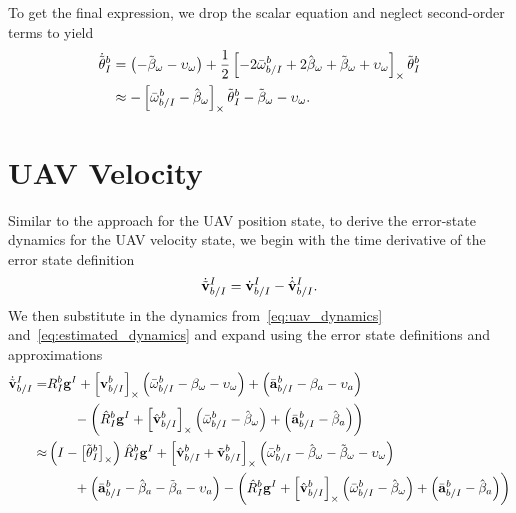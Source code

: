 To get the final expression, we drop the scalar equation and neglect
second-order terms to yield
\begin{align}
  \dot{\tilde{\mathrm{\mathbf{\theta}}}}_I^b
  &=
    \left( - \tilde{\mathrm{\mathbf{\beta}}}_\omega -
    \mathrm{\mathbf{\upsilon}}_\omega \right) 
    + \frac{1}{2}
    \left[  -2\bar{\mathrm{\mathbf{\omega}}}_{b/I}^b + 2\hat{\mathrm{\mathbf{\beta}}}_\omega
      + \tilde{\mathrm{\mathbf{\beta}}}_\omega + \mathrm{\mathbf{\upsilon}}_\omega  \right]_{\times}
    \tilde{\mathrm{\mathbf{\theta}}}_I^b \\
  &\approx
  -\left[  \bar{\mathrm{\mathbf{\omega}}}_{b/I}^b - \hat{\mathrm{\mathbf{\beta}}}_\omega \right]_{\times}
    \tilde{\mathrm{\mathbf{\theta}}}_I^b
    - \tilde{\mathrm{\mathbf{\beta}}}_\omega -
    \mathrm{\mathbf{\upsilon}}_\omega .
\end{align}

\section{UAV Velocity}
Similar to the approach for the UAV position state, to derive the error-state
dynamics for the UAV velocity state, we begin with the time derivative of the
error state definition
\begin{equation}
  \dot{\tilde{\mathrm{\mathbf{v}}}}_{b/I}^I = \dot{\mathrm{\mathbf{v}}}_{b/I}^I -
  \dot{\hat{\mathrm{\mathbf{v}}}}_{b/I}^I.
\end{equation}
We then substitute in the dynamics from~\eqref{eq:uav_dynamics}
and~\eqref{eq:estimated_dynamics} and expand using the error state definitions
and approximations
\begin{align}
  \dot{\tilde{\mathrm{\mathbf{v}}}}_{b/I}^I
  =&
  R_I^b \mathrm{\mathbf{g}}^I
  +
  \left[ \mathrm{\mathbf{v}}_{b/I}^b \right]_{\times}
  \left( \bar{\mathrm{\mathbf{\omega}}}_{b/I}^b - \mathrm{\mathbf{\beta}}_\omega -
  \mathrm{\mathbf{\upsilon}}_\omega \right)
  +
  \left( \bar{\mathrm{\mathbf{a}}}_{b/I}^b - \mathrm{\mathbf{\beta}}_a - \mathrm{\mathbf{\upsilon}}_a \right) \\
                                  & \qquad -
                                  \left( \hat{R}_I^b \mathrm{\mathbf{g}}^I
  +
  \left[ \hat{\mathrm{\mathbf{v}}}_{b/I}^b \right]_{\times}
  \left( \bar{\mathrm{\mathbf{\omega}}}_{b/I}^b - \hat{\mathrm{\mathbf{\beta}}}_\omega \right)
  +
\left( \bar{\mathrm{\mathbf{a}}}_{b/I}^b - \hat{\mathrm{\mathbf{\beta}}}_a \right) \right) \nonumber \\
  \approx&
  \left( I - \left[ \tilde{\mathrm{\mathbf{\theta}}}_I^b  \right]_{\times}\right) \hat{R}_I^b \mathrm{\mathbf{g}}^I
  +
  \left[  \hat{\mathrm{\mathbf{v}}}_{b/I}^b + \tilde{\mathrm{\mathbf{v}}}_{b/I}^b  \right]_{\times} 
  \left( \bar{\mathrm{\mathbf{\omega}}}_{b/I}^b - \hat{\mathrm{\mathbf{\beta}}}_\omega -
    \tilde{\mathrm{\mathbf{\beta}}}_\omega -
  \mathrm{\mathbf{\upsilon}}_\omega \right) \\
                                  & \qquad 
                                  + \left( \bar{\mathrm{\mathbf{a}}}_{b/I}^b - \hat{\mathrm{\mathbf{\beta}}}_a - \tilde{\mathrm{\mathbf{\beta}}}_a - \mathrm{\mathbf{\upsilon}}_a \right)
  - \left( \hat{R}_I^b \mathrm{\mathbf{g}}^I
  +
  \left[ \hat{\mathrm{\mathbf{v}}}_{b/I}^b \right]_{\times}
  \left( \bar{\mathrm{\mathbf{\omega}}}_{b/I}^b - \hat{\mathrm{\mathbf{\beta}}}_\omega \right)
  +
\left( \bar{\mathrm{\mathbf{a}}}_{b/I}^b - \hat{\mathrm{\mathbf{\beta}}}_a \right) \right) \nonumber
\end{align}
